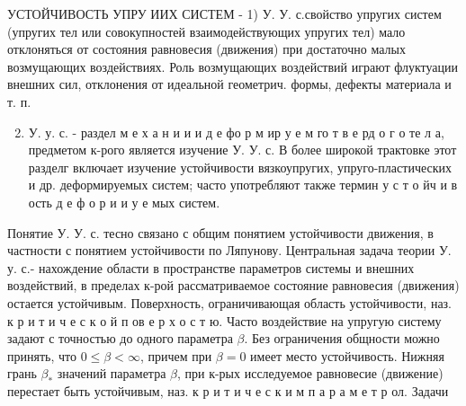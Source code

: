 \documentclass[10pt]{article}
\begin{document}
УСТОЙЧИВОСТЬ УПРУ ИИХ СИСТЕМ - 1) У. У. с.свойство упругих систем (упругих тел или совокупностей взаимодействующих упругих тел) мало отклоняться от состояния равновесия (движения) при достаточно малых возмущающих воздействиях. Роль возмущающих воздействий играют флуктуации внешних сил, отклонения от идеальной геометрич. формы, дефекты материала и т. п.



\begin{enumerate}

  \setcounter{enumi}{1}

  \item У. у. с. - раздел м е х а н и и и д е фо р м ир у е м го т в е рд о г о те л а, предметом к-рого является изучение У. У. с. В более широкой трактовке этот разделг включает изучение устойчивости вязкоупругих, упруго-пластических и др. деформируемых систем; часто употребляют также термин у с т о йч и в ость д е ф о р и и у е мых систем.

\end{enumerate}



Понятие У. У. с. тесно связано с общим понятием устойчивости движения, в частности с понятием устойчивости по Ляпунову. Центральная задача теории У. у. с.- нахождение области в пространстве параметров системы и внешних воздействий, в пределах к-рой рассматриваемое состояние равновесия (движения) остается устойчивым. Поверхность, ограничивающая область устойчивости, наз. к р и т и ч е с к о й п ов е р х о с т ю. Часто воздействие на упругую систему задают с точностью до одного параметра $\beta$. Без ограничения общности можно принять, что $0 \leqslant \beta<\infty$, причем при $\beta=0$ имеет место устойчивость. Нижняя грань $\beta_{*}$ значений параметра $\beta$, при к-рых исследуемое равновесие (движение) перестает быть устойчивым, наз. к р и т и ч е с к и м п а р а м е т р ол. Задачи
\end{document}
